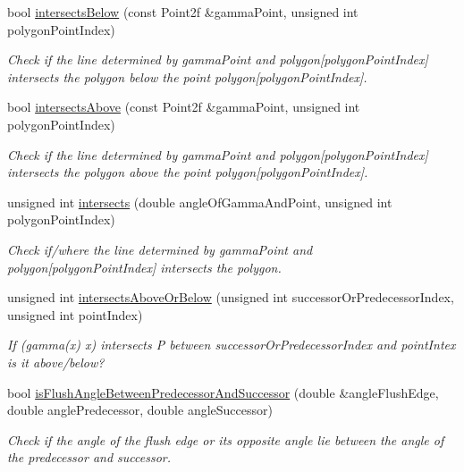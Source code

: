 \begin{DoxyCompactItemize}
bool \hyperlink{classmultiscale_1_1MinEnclosingTriangleFinder_a0abe1c7d5ef5a43f8ea1b404db0066e0}{intersects\-Below} (const Point2f \&gamma\-Point, unsigned int polygon\-Point\-Index)
\begin{DoxyCompactList}\small\item\em Check if the line determined by gamma\-Point and polygon\mbox{[}polygon\-Point\-Index\mbox{]} intersects the polygon below the point polygon\mbox{[}polygon\-Point\-Index\mbox{]}. \end{DoxyCompactList}\item 
bool \hyperlink{classmultiscale_1_1MinEnclosingTriangleFinder_aba0848fcc9021b379fd5f02a6708912d}{intersects\-Above} (const Point2f \&gamma\-Point, unsigned int polygon\-Point\-Index)
\begin{DoxyCompactList}\small\item\em Check if the line determined by gamma\-Point and polygon\mbox{[}polygon\-Point\-Index\mbox{]} intersects the polygon above the point polygon\mbox{[}polygon\-Point\-Index\mbox{]}. \end{DoxyCompactList}\item 
unsigned int \hyperlink{classmultiscale_1_1MinEnclosingTriangleFinder_a586e3fde222d1464eb57a3e20ceb136c}{intersects} (double angle\-Of\-Gamma\-And\-Point, unsigned int polygon\-Point\-Index)
\begin{DoxyCompactList}\small\item\em Check if/where the line determined by gamma\-Point and polygon\mbox{[}polygon\-Point\-Index\mbox{]} intersects the polygon. \end{DoxyCompactList}\item 
unsigned int \hyperlink{classmultiscale_1_1MinEnclosingTriangleFinder_a622303a315704ffb0e262ec66f2a07fb}{intersects\-Above\-Or\-Below} (unsigned int successor\-Or\-Predecessor\-Index, unsigned int point\-Index)
\begin{DoxyCompactList}\small\item\em If (gamma(x) x) intersects P between successor\-Or\-Predecessor\-Index and point\-Intex is it above/below? \end{DoxyCompactList}\item 
bool \hyperlink{classmultiscale_1_1MinEnclosingTriangleFinder_a067f421f84dfd1803c241efc85dbc0bb}{is\-Flush\-Angle\-Between\-Predecessor\-And\-Successor} (double \&angle\-Flush\-Edge, double angle\-Predecessor, double angle\-Successor)
\begin{DoxyCompactList}\small\item\em Check if the angle of the flush edge or its opposite angle lie between the angle of the predecessor and successor. \end{DoxyCompactList}\item 

\end{DoxyCompactItemize}
